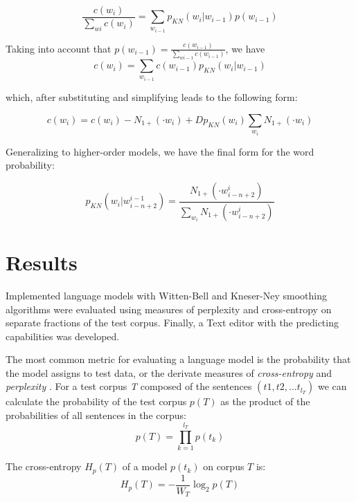 \documentclass[10pt, a4paper]{article}
\begin{document}
\begin{equation}
\frac{c(w_{i})}{\sum_{w{i}} c(w_{i})} = \sum_{w_{i-1}} p_{KN}(w_{i} | w_{i-1} )p(w_{i-1})
\end{equation}

Taking into account that $p(w_{i-1}) =\frac{c(w_{i-1})}{\sum_{w{i-1}} c(w_{i-1})} $, we have
\begin{equation}
c(w_{i}) = \sum_{w_{i-1}} c(w_{i-1}) p_{KN}(w_{i} | w_{i-1})
\end{equation}

which, after substituting and simplifying leads to the following form:

\begin{equation}
c(w_{i}) = c(w_{i}) - N_{1+}(\cdot w_{i}) + D p_{KN}(w_{i}) \sum_{w_{i}} N_{1+}(\cdot w_{i})
\end{equation}

Generalizing to higher-order models, we have the final form for the word probability:

\begin{equation}
p_{KN}(w_{i} | w_{i-n+2}^{i-1}) = \frac{N_{1+}(\cdot w_{i-n+2}^{i})}{\sum_{w_{i}}N_{1+}(\cdot w_{i-n+2}^{i})} 
\end{equation}

\section{Results}

Implemented language models with Witten-Bell and Kneser-Ney smoothing algorithms were evaluated using measures of perplexity and cross-entropy on separate fractions of the test corpus. Finally, a Text editor with the predicting capabilities was developed.

The most common metric for evaluating a language model is the probability that the model assigns to test data, or the derivate measures of \textit{cross-entropy} and \textit{perplexity} \cite{1_chen1999empirical}. For a test corpus \textit{T} composed of the sentences $(t1, t2 , ... t_{l_{T}})$ we can calculate the probability of the test corpus $p(T)$ as the product of the probabilities of all sentences in the corpus:
\begin{equation}
p(T) = \prod_{k=1}^{l_{T}} p(t_{k})
\end{equation}

The cross-entropy $H_{p}(T)$ of a model $p(t_{k})$ on corpus $T$ is:
\begin{equation}
H_{p}(T) = - \frac{1}{W_{T}} \log_{2} p(T)
\end{equation}
\end{document}
